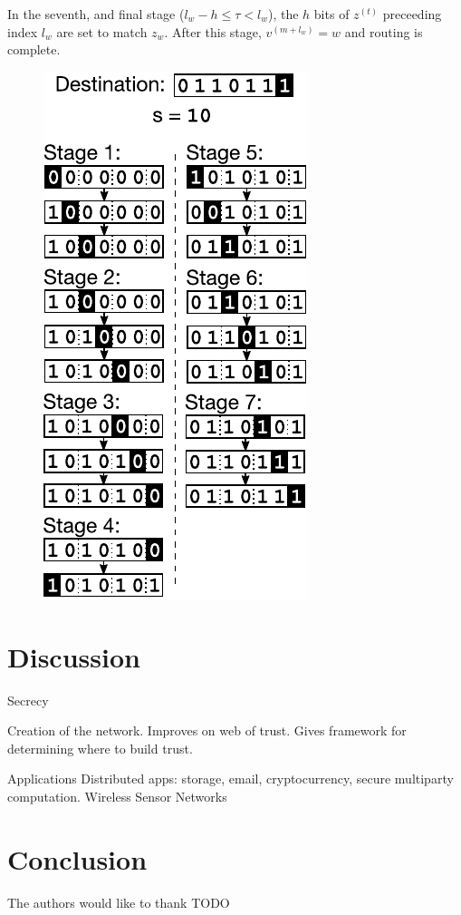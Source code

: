 \documentclass[prodmode,permissions]{acmsmall-ec16}
\begin{document}
In the seventh, and final stage ($l_w - h \leq \tau < l_w$), the $h$ bits of $z^{(t)}$
preceeding index $l_w$ are set to match $z_w$.
After this stage, $v^{(m + l_w)} = w$ and routing is complete.

\begin{figure}
\begin{center}
\includegraphics{fig-routing.pdf}
\end{center}
\caption{
\label{fig:routing}
}
\end{figure}

\section{Discussion}

Secrecy

Creation of the network.
Improves on web of trust.
Gives framework for determining where to build trust.

Applications
Distributed apps: storage, email, cryptocurrency, secure multiparty computation.
Wireless Sensor Networks

\section{Conclusion}

\begin{acks}
The authors would like to thank TODO
\end{acks}



\end{document}
